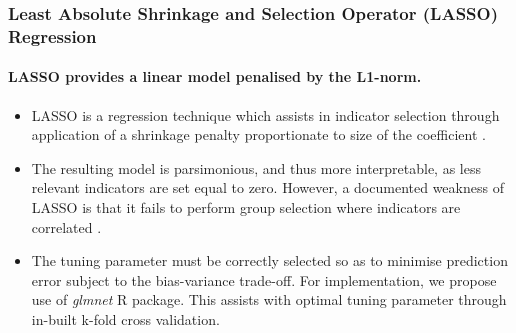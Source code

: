 \begin{frame}
    \frametitle{Least Absolute Shrinkage and Selection Operator (LASSO) Regression} 
    \framesubtitle{LASSO provides a linear model penalised by the L1-norm.}

 
\begin{itemize}
    \item LASSO is a regression technique which assists in indicator selection through application of a shrinkage penalty proportionate to size of the coefficient \parencite{Tibshirani_1996}.
    \item The resulting model is parsimonious, and thus more interpretable,  as less relevant indicators are set equal to zero. However, a documented weakness of LASSO is that it fails to perform group selection where indicators are correlated \parencite{Liu_Li_2017}. 
    \item The tuning parameter must be correctly selected so as to minimise prediction error subject to the bias-variance trade-off. For implementation, we propose use of \emph{glmnet} R package. This assists with optimal tuning parameter through in-built k-fold cross validation. 
\end{itemize}


 
\end{frame}
